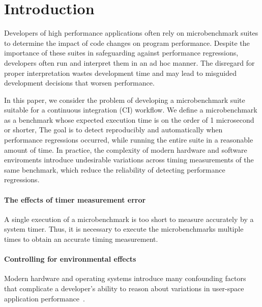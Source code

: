 \documentclass[conference]{IEEEtran}
\begin{document}
\IEEEpeerreviewmaketitle


\label{sec:intro}
\section{Introduction}

Developers of high performance applications often rely on microbenchmark suites to determine
the impact of code changes on program performance. Despite the importance of these suites in
safeguarding against performance regressions, developers often run and interpret them in an
ad hoc manner. The disregard for proper interpretation wastes development time and may
lead to misguided development decisions that worsen performance.

In this paper, we consider the problem of developing a microbenchmark suite
suitable for a continuous integration (CI) workflow. We define a microbenchmark
as a benchmark whose expected execution time is on the order of 1 microsecond
or shorter,
The goal is to detect reproducibly and automatically when performance regressions occurred,
while running the entire suite in a reasonable amount of time.
In practice, the complexity of modern hardware and software enviroments introduce
undesirable variations across timing measurements of the same benchmark, which
reduce the reliability of detecting performance regressions.


\paragraph{The effects of timer measurement error}
A single execution of a microbenchmark is too short to measure
accurately by a system timer. Thus, it is necessary to execute the
microbenchmarks multiple times to obtain an accurate timing measurement.


\paragraph{Controlling for environmental effects}
Modern hardware and operating systems introduce many confounding factors that
complicate a developer's ability to reason about variations in user-space
application performance~\cite{HP5e}.
\end{document}
